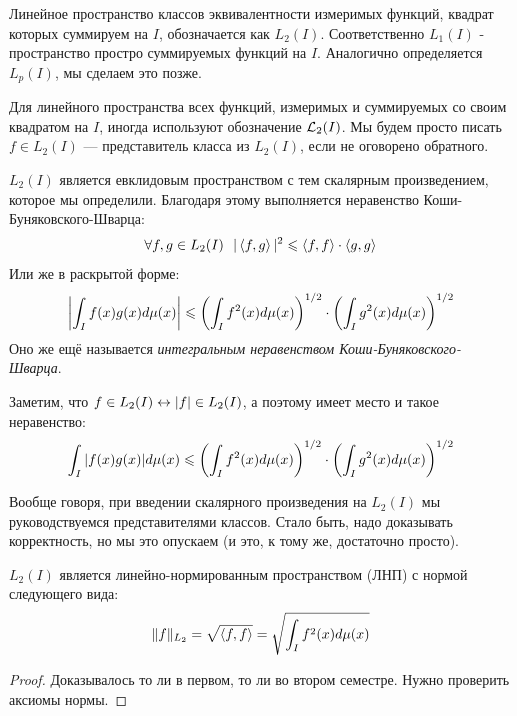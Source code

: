 \begin{definition}
	Линейное пространство классов эквивалентности измеримых функций, квадрат которых суммируем на $I$, обозначается как $L_2(I)$. Соответственно $L_1(I)$ - пространство простро суммируемых функций на $I$. Аналогично определяется $L_p(I)$, мы сделаем это позже.
\end{definition}

\begin{anote}
	Для линейного пространства всех функций, измеримых и суммируемых со своим квадратом на $I$, иногда используют обозначение $\mathcal{L}_2(I)$. Мы будем просто писать $f \in L_2(I)$ --- представитель класса из $L_2(I)$, если не оговорено обратного.
\end{anote}

\begin{corollary}
	$L_2(I)$ является евклидовым пространством с тем скалярным произведением, которое мы определили. Благодаря этому выполняется неравенство Коши-Буняковского-Шварца:
	\[
		\forall f, g \in L_2(I)\ \ |\left\langle f, g\right\rangle|^2 \leqslant \left\langle f, f\right\rangle \cdot \left\langle g, g\right\rangle
	\]
	Или же в раскрытой форме:
	\[
		\left|\int_I f(x)g(x)d\mu(x)\right| \leqslant \left(\int_I f^2(x)d\mu(x)\right)^{1/2} \cdot \left(\int_I g^2(x)d\mu(x)\right)^{1/2}
	\]
	Оно же ещё называется \textit{интегральным неравенством Коши-Буняковского-Шварца}.
\end{corollary}

\begin{note}
	Заметим, что $f \in L_2(I) \leftrightarrow |f| \in L_2(I)$, а поэтому имеет место и такое неравенство:
	\[
		\int_I |f(x)g(x)|d\mu(x) \leqslant \left(\int_I f^2(x)d\mu(x)\right)^{1/2} \cdot \left(\int_I g^2(x)d\mu(x)\right)^{1/2}
	\]
\end{note}

\begin{anote}
	Вообще говоря, при введении скалярного произведения на $L_2(I)$ мы руководствуемся представителями классов. Стало быть, надо доказывать корректность, но мы это опускаем (и это, к тому же, достаточно просто).
\end{anote}

\begin{proposition}
	$L_2(I)$ является линейно-нормированным пространством (ЛНП) с нормой следующего вида:
	\[
		\|f\|_{L_2} = \sqrt{\left\langle f, f\right\rangle} = \sqrt{\int_I f^2(x)d\mu(x)}
	\]
\end{proposition}

\begin{proof}
	Доказывалось то ли в первом, то ли во втором семестре. Нужно проверить аксиомы нормы.
\end{proof}


